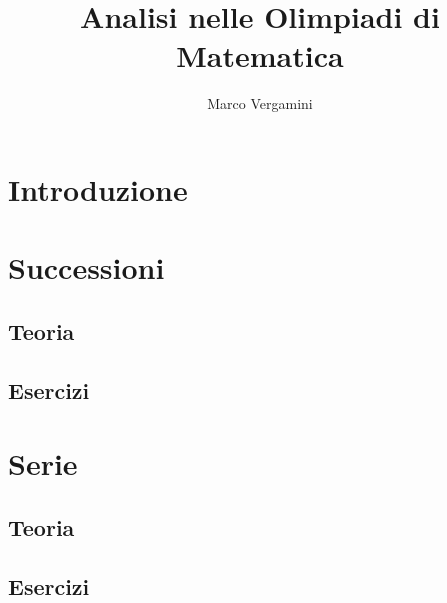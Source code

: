 \documentclass{article}
\title{Analisi nelle Olimpiadi di Matematica}
\date{}
\author{Marco Vergamini}
\begin{document}
\maketitle
\newpage
\tableofcontents
\newpage


\section*{Introduzione}


\newpage

\section{Successioni}

\subsection{Teoria}


\subsection{Esercizi}

\newpage

\section{Serie}

\subsection{Teoria}

\subsection{Esercizi}

\newpage
\end{document}
